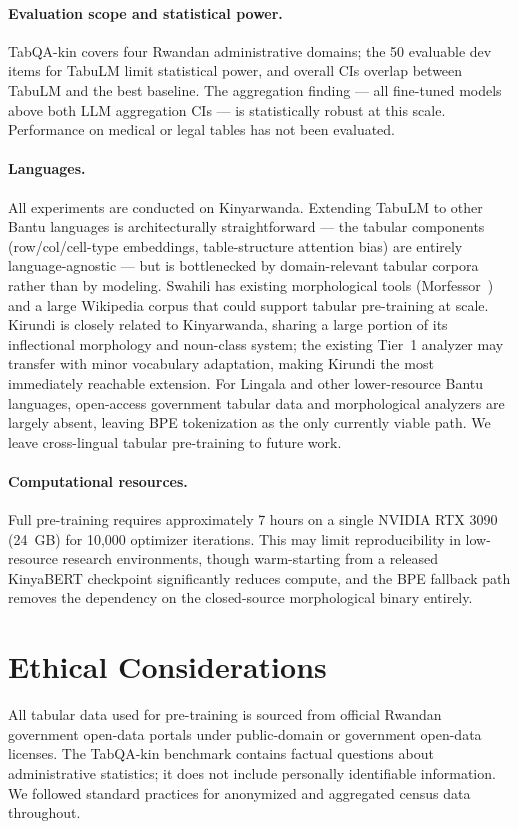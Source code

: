 \documentclass[11pt]{article}
\begin{document}
\paragraph{Evaluation scope and statistical power.}
TabQA-kin covers four Rwandan administrative domains; the 50 evaluable dev items for TabuLM limit statistical power, and overall CIs overlap between TabuLM and the best baseline.
The aggregation finding --- all fine-tuned models above both LLM aggregation CIs --- is statistically robust at this scale.
Performance on medical or legal tables has not been evaluated.

\paragraph{Languages.}
All experiments are conducted on Kinyarwanda.
Extending TabuLM to other Bantu languages is architecturally straightforward --- the tabular components (row/col/cell-type embeddings, table-structure attention bias) are entirely language-agnostic --- but is bottlenecked by domain-relevant tabular corpora rather than by modeling.
Swahili has existing morphological tools (Morfessor~\citep{creutz-lagus-2007-unsupervised}) and a large Wikipedia corpus that could support tabular pre-training at scale.
Kirundi is closely related to Kinyarwanda, sharing a large portion of its inflectional morphology and noun-class system; the existing Tier~1 analyzer may transfer with minor vocabulary adaptation, making Kirundi the most immediately reachable extension.
For Lingala and other lower-resource Bantu languages, open-access government tabular data and morphological analyzers are largely absent, leaving BPE tokenization as the only currently viable path.
We leave cross-lingual tabular pre-training to future work.

\paragraph{Computational resources.}
Full pre-training requires approximately 7 hours on a single NVIDIA RTX 3090 (24~GB) for 10,000 optimizer iterations.
This may limit reproducibility in low-resource research environments, though warm-starting from a released KinyaBERT checkpoint significantly reduces compute, and the BPE fallback path removes the dependency on the closed-source morphological binary entirely.

\section*{Ethical Considerations}

All tabular data used for pre-training is sourced from official Rwandan government open-data portals under public-domain or government open-data licenses.
The TabQA-kin benchmark contains factual questions about administrative statistics; it does not include personally identifiable information.
We followed standard practices for anonymized and aggregated census data throughout.


\end{document}
